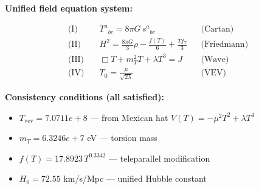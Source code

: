 
\textbf{Unified field equation system:}

\begin{align}
  \text{(I)} \quad & T^a{}_{bc} = 8\pi G \, s^a{}_{bc} && \text{(Cartan)} \\
  \text{(II)} \quad & H^2 = \frac{8\pi G}{3}\rho - \frac{f(T)}{6} + \frac{Tf_T}{3} && \text{(Friedmann)} \\
  \text{(III)} \quad & \Box T + m_T^2 T + \lambda T^3 = J && \text{(Wave)} \\
  \text{(IV)} \quad & T_0 = \frac{\mu}{\sqrt{2\lambda}} && \text{(VEV)}
\end{align}

\textbf{Consistency conditions (all satisfied):}
\begin{itemize}
  \item $T_{\text{vev}} = 7.0711e+8$ — from Mexican hat $V(T) = -\mu^2 T^2 + \lambda T^4$
  \item $m_T = 6.3246e+7$ eV — torsion mass
  \item $f(T) = 17.8923 \, T^{0.3342}$ — teleparallel modification
  \item $H_0 = 72.55$ km/s/Mpc — unified Hubble constant
\end{itemize}